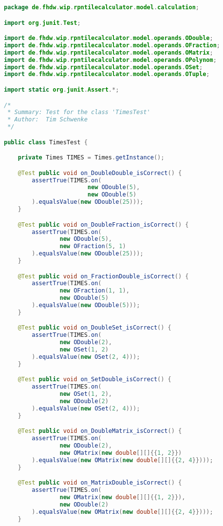 \begin{lstlisting}[caption=TimesTest (Schwenke),label=list:TimesTest,language=Java]
package de.fhdw.wip.rpntilecalculator.model.calculation;

import org.junit.Test;

import de.fhdw.wip.rpntilecalculator.model.operands.ODouble;
import de.fhdw.wip.rpntilecalculator.model.operands.OFraction;
import de.fhdw.wip.rpntilecalculator.model.operands.OMatrix;
import de.fhdw.wip.rpntilecalculator.model.operands.OPolynom;
import de.fhdw.wip.rpntilecalculator.model.operands.OSet;
import de.fhdw.wip.rpntilecalculator.model.operands.OTuple;

import static org.junit.Assert.*;

/*
 * Summary: Test for the class 'TimesTest'
 * Author:  Tim Schwenke
 */

public class TimesTest {

    private Times TIMES = Times.getInstance();

    @Test public void on_DoubleDouble_isCorrect() {
        assertTrue(TIMES.on(
                        new ODouble(5),
                        new ODouble(5)
        ).equalsValue(new ODouble(25)));
    }

    @Test public void on_DoubleFraction_isCorrect() {
        assertTrue(TIMES.on(
                new ODouble(5),
                new OFraction(5, 1)
        ).equalsValue(new ODouble(25)));
    }

    @Test public void on_FractionDouble_isCorrect() {
        assertTrue(TIMES.on(
                new OFraction(1, 1),
                new ODouble(5)
        ).equalsValue(new ODouble(5)));
    }

    @Test public void on_DoubleSet_isCorrect() {
        assertTrue(TIMES.on(
                new ODouble(2),
                new OSet(1, 2)
        ).equalsValue(new OSet(2, 4)));
    }

    @Test public void on_SetDouble_isCorrect() {
        assertTrue(TIMES.on(
                new OSet(1, 2),
                new ODouble(2)
        ).equalsValue(new OSet(2, 4)));
    }

    @Test public void on_DoubleMatrix_isCorrect() {
        assertTrue(TIMES.on(
                new ODouble(2),
                new OMatrix(new double[][]{{1, 2}})
        ).equalsValue(new OMatrix(new double[][]{{2, 4}})));
    }

    @Test public void on_MatrixDouble_isCorrect() {
        assertTrue(TIMES.on(
                new OMatrix(new double[][]{{1, 2}}),
                new ODouble(2)
        ).equalsValue(new OMatrix(new double[][]{{2, 4}})));
    }


\end{lstlisting}

